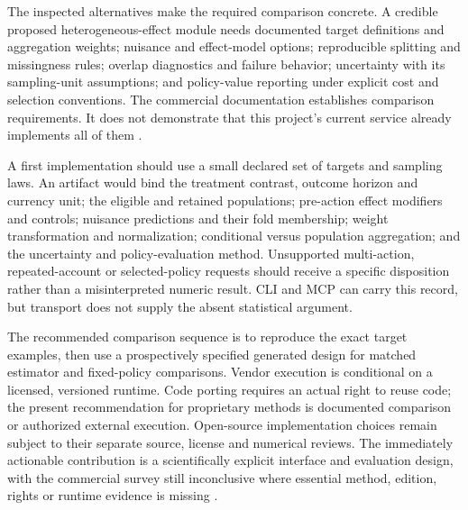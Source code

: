 The inspected alternatives make the required comparison concrete. A
credible proposed heterogeneous-effect module needs documented target
definitions and aggregation weights; nuisance and effect-model options;
reproducible splitting and missingness rules; overlap diagnostics and
failure behavior; uncertainty with its sampling-unit assumptions; and
policy-value reporting under explicit cost and selection conventions.
The commercial documentation establishes comparison requirements. It does
not demonstrate that this project's current service already implements
all of them \cite{exec13_ch_stata,exec13_ch_jmp_causal,exec13_ch_scope}.

A first implementation should use a small declared set of targets and
sampling laws. An artifact would bind the treatment contrast, outcome
horizon and currency unit; the eligible and retained populations;
pre-action effect modifiers and controls; nuisance predictions and their
fold membership; weight transformation and normalization; conditional
versus population aggregation; and the uncertainty and policy-evaluation
method. Unsupported multi-action, repeated-account or selected-policy
requests should receive a specific disposition rather than a
misinterpreted numeric result. CLI and MCP can carry this record, but
transport does not supply the absent statistical argument.

The recommended comparison sequence is to reproduce the exact target
examples, then use a prospectively specified generated design for matched
estimator and fixed-policy comparisons. Vendor execution is conditional
on a licensed, versioned runtime. Code porting requires an actual right
to reuse code; the present recommendation for proprietary methods is
documented comparison or authorized external execution. Open-source
implementation choices remain subject to their separate source, license
and numerical reviews. The immediately actionable contribution is a
scientifically explicit interface and evaluation design, with the
commercial survey still inconclusive where essential method, edition,
rights or runtime evidence is missing \cite{exec13_ch_scope}.
\label{exec13:commercial-heterogeneity-end}
